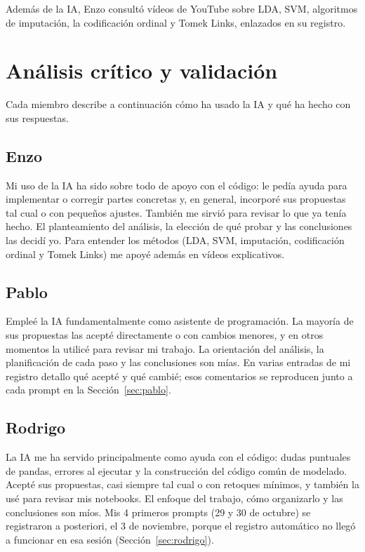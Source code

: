 \documentclass[11pt,a4paper]{article}
\begin{document}
Además de la IA, Enzo consultó vídeos de YouTube sobre LDA, SVM, algoritmos de imputación, la
codificación ordinal y Tomek Links, enlazados en su registro.

\section{Análisis crítico y validación}

Cada miembro describe a continuación cómo ha usado la IA y qué ha hecho con sus respuestas.

\subsection*{Enzo}
Mi uso de la IA ha sido sobre todo de apoyo con el código: le pedía ayuda para implementar o corregir partes concretas y, en general, incorporé sus propuestas tal cual o con pequeños ajustes. También me sirvió para revisar lo que ya tenía hecho. El planteamiento del análisis, la elección de qué probar y las conclusiones las decidí yo. Para entender los métodos (LDA, SVM, imputación, codificación ordinal y Tomek Links) me apoyé además en vídeos explicativos.

\subsection*{Pablo}
Empleé la IA fundamentalmente como asistente de programación. La mayoría de sus propuestas las acepté directamente o con cambios menores, y en otros momentos la utilicé para revisar mi trabajo. La orientación del análisis, la planificación de cada paso y las conclusiones son mías.
En varias entradas de mi registro detallo qué acepté y qué cambié; esos comentarios se reproducen
junto a cada prompt en la Sección~\ref{sec:pablo}.

\subsection*{Rodrigo}
La IA me ha servido principalmente como ayuda con el código: dudas puntuales de pandas, errores al ejecutar y la construcción del código común de modelado. Acepté sus propuestas, casi siempre tal cual o con retoques mínimos, y también la usé para revisar mis notebooks. El enfoque del trabajo, cómo organizarlo y las conclusiones son míos.
Mis 4 primeros prompts (29 y 30 de octubre) se registraron a posteriori, el 3 de noviembre, porque el
registro automático no llegó a funcionar en esa sesión (Sección~\ref{sec:rodrigo}).
\end{document}
